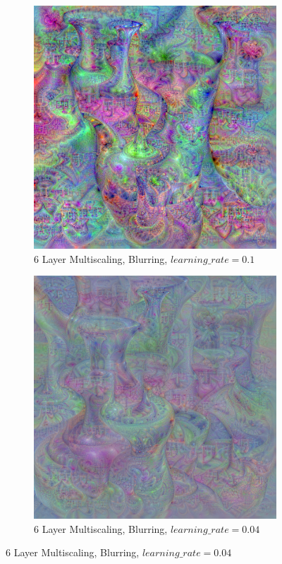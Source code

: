 \begin{figure}
    \captionsetup{justification=centering}

    \begin{subfigure}[t]{0.31\textwidth}
        \captionsetup{justification=centering}
        \centering
        \includegraphics[width=.7\linewidth]{figuras/feat_vis/experiments/classes/cl883/random_image_ci883_lr1e-1_pl6.png}
        \caption{6 Layer Multiscaling, Blurring, \(learning\_rate = 0.1\)}
    \end{subfigure}
    \hfill
    \begin{subfigure}[t]{0.31\textwidth}
        \captionsetup{justification=centering}
        \centering
        \includegraphics[width=.7\linewidth]{figuras/feat_vis/experiments/classes/cl883/random_image_ci883_lr4e-2_pl6.png}
        \caption{6 Layer Multiscaling, Blurring, \(learning\_rate = 0.04\)}

\end{subfigure}
\end{figure}
